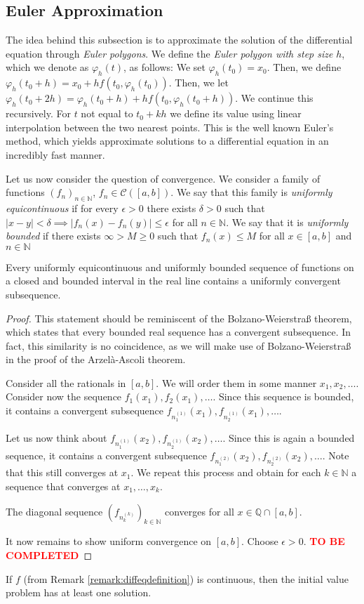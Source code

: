 \documentclass[prb,12pt]{revtex4-2}
\theoremstyle{definition}
\theoremstyle{definition}
\theoremstyle{definition}
\newcommand{\N}{\mathbb{N}}
\newcommand{\Q}{\mathbb{Q}}
\begin{document}
	\subsection{Euler Approximation}
	The idea behind this subsection is to approximate the solution of the differential equation through \emph{Euler polygons}. We define the \emph{Euler polygon with step size} $h$, which we denote as $\varphi_h(t)$, as follows: We set $\varphi_h(t_0) = x_0$. Then, we define $\varphi_h(t_0+h)=x_0 + hf(t_0, \varphi_h(t_0))$. Then, we let $\varphi_h(t_0 + 2h)= \varphi_h(t_0+h)+hf(t_0, \varphi_h(t_0+h))$. We continue this recursively. For $t$ not equal to $t_0+kh$ we define its value using linear interpolation between the two nearest points. This is the well known Euler's method, which yields approximate solutions to a differential equation in an incredibly fast manner.
	
	Let us now consider the question of convergence. We consider a family of functions $(f_n)_{n\in \N}$, $f_n\in \mathcal{C}([a,b])$. We say that this family is \emph{uniformly equicontinuous} if for every $\epsilon>0$ there exists $\delta>0$ such that $|x-y|<\delta\implies |f_n(x)-f_n(y)|\le \epsilon$ for all $n\in \N$. We say that it is \emph{uniformly bounded} if there exists $\infty>M\ge 0$ such that $f_n(x)\le M$ for all $x\in [a,b]$ and $n\in \N$
	\begin{Theorem}
		Every uniformly equicontinuous and uniformly bounded sequence of functions on a closed and bounded interval in the real line contains a uniformly convergent subsequence.
	\end{Theorem}
	\begin{proof}
		This statement should be reminiscent of the Bolzano-Weierstraß theorem, which states that every bounded real sequence has a convergent subsequence. In fact, this similarity is no coincidence, as we will make use of Bolzano-Weierstraß in the proof of the Arzelà-Ascoli theorem.
		
		Consider all the rationals in $[a,b]$. We will order them in some manner $x_1, x_2, \dots$. Consider now the sequence $f_1(x_1), f_2(x_1), \dots$. Since this sequence is bounded, it contains a convergent subsequence $f_{n^{(1)}_1}(x_1), f_{n^{(1)}_2}(x_1), \dots$.
		
		Let us now think about $f_{n^{(1)}_1}(x_2), f_{n^{(1)}_2}(x_2), \dots$. Since this is again a bounded sequence, it contains a convergent subsequence $f_{n^{(2)}_1}(x_2), f_{n^{(2)}_2}(x_2), \dots$. Note that this still converges at $x_1$. We repeat this process and obtain for each $k\in \N$ a sequence that converges at $x_1, \dots, x_k$. 
		
		The diagonal sequence $(f_{n^{(k)}_k})_{k\in \N}$ converges for all $x\in \Q\cap [a,b]$.
		
		It now remains to show uniform convergence on $[a,b]$. Choose $\epsilon>0$. \textcolor{red}{\textbf{TO BE COMPLETED}}
	\end{proof}
	\begin{Theorem}[Peano]\label{thm:peano}
If $f$ (from Remark \ref{remark:diffeqdefinition}) is continuous, then the initial value problem has at least one solution.
	\end{Theorem}
\end{document}
